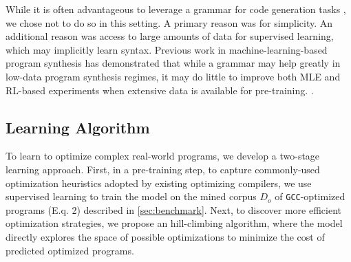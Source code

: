 \documentclass{article}
\begin{document}
 

 
While it is often advantageous to leverage a grammar for code generation tasks \citep{parisotto2016neuro,yin-neubig-2017-syntactic}, we chose not to do so in this setting. A primary reason was for simplicity. An additional reason was access to large amounts of data for supervised learning, which may implicitly learn syntax. Previous work in machine-learning-based program synthesis has demonstrated that while a grammar may help greatly in low-data program synthesis regimes, it may do little to improve both MLE and RL-based experiments when extensive data is available for pre-training. 
\cite{bunel2018leveraging}.

\subsection{Learning Algorithm}

To learn to optimize complex real-world programs, we develop a two-stage learning approach.
First, in a pre-training step, to capture commonly-used optimization heuristics adopted by existing optimizing compilers, we use supervised learning to train the model on the mined corpus $D_o$ of \texttt{GCC}-optimized programs (E.q. 2) described in \cref{sec:benchmark}. 
Next, to discover more efficient optimization strategies, we propose an  hill-climbing algorithm, where the model directly explores the space of possible optimizations to minimize the cost of predicted optimized programs.
\end{document}
